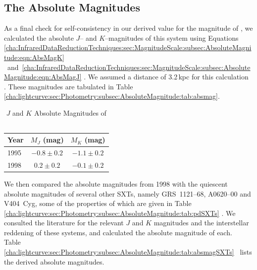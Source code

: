 
\subsection{The Absolute Magnitudes}\label{cha:lightcurve:sec:Photometry:subsec:AbsoluteMagnitude}

As a final check for self-consistency in our derived value for the magnitude of \groj, we calculated the absolute $J$-- and $K$--magnitudes of this system using Equations~%
\ref{cha:InfraredDataReductionTechniques:sec:MagnitudeScale:subsec:AbsoluteMagnitude:eqn:AbsMagK}%
\ and~\ref{cha:InfraredDataReductionTechniques:sec:MagnitudeScale:subsec:AbsoluteMagnitude:eqn:AbsMagJ}%
. We assumed a distance of 3.2\,kpc for this calculation~\cite{HjellmingRupen:1995}%
. These magnitudes are tabulated in Table~%
\vref{cha:lightcurve:sec:Photometry:subsec:AbsoluteMagnitude:tab:absmag}. %

\begin{table}[htb]
\caption{$J$ and $K$ Absolute Magnitudes of \groj\ }\label{cha:lightcurve:sec:Photometry:subsec:AbsoluteMagnitude:tab:absmag}

\begin{minipage}{\linewidth}
\renewcommand{\thefootnote}{\thempfootnote}

\begin{center}
\begin{tabular}{|l||||c|c|}

\hline
Year & $M_J$ (mag) & $M_K$ (mag) \\\hline\hline\hline\hline
1995 & $-0.8\pm0.2$ & $-1.1\pm0.2$ \\\hline
1998 & $0.2\pm0.2$ & $-0.1\pm0.2$ \\\hline
\hline
\end{tabular}
\end{center}
\end{minipage}
\end{table}

\vspace{\myparskip}

We then compared the absolute magnitudes from 1998 with the quiescent
absolute magnitudes of several other SXTs, namely \mbox{GRS 1121--68}, \mbox{A0620--00} and \mbox{V404
Cyg}, some of the properties of which are given in Table~%
\vref{cha:lightcurve:sec:Photometry:subsec:AbsoluteMagnitude:tab:pdSXTs}%
. We consulted the literature for the relevant $J$ and $K$ magnitudes
and the interstellar reddening of these systems, and calculated the
absolute magnitude of each. Table~%
\vref{cha:lightcurve:sec:Photometry:subsec:AbsoluteMagnitude:tab:absmagSXTs}%
\ lists the derived absolute magnitudes. %

